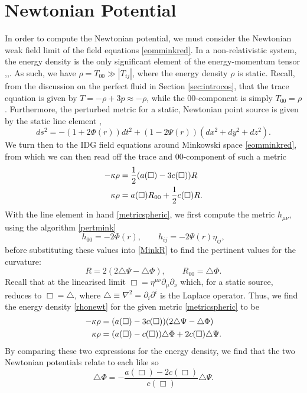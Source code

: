 \chapter{Newtonian Potential}
\label{chap:NewtPot}
In order to compute the Newtonian potential, we must consider the Newtonian weak field limit of the field equations \eqref{eomminkred}. In a non-relativistic system, the energy density is the only significant element of the energy-momentum tensor \cite{Carroll:2004st},\cite{Wald:GR},\cite{Blau}. As such, we have $\rho=T_{00}\gg |T_{ij}|$, where the energy density $\rho$ is static. Recall, from the discussion on the perfect fluid in Section \ref{sec:introcos}, that the trace equation is given by $ T=-\rho+3p\approx-\rho$, while the 00-component is simply $T_{00}=\rho$. Furthermore, the perturbed metric for a static, Newtonian point source is given by the static line element \cite{Quandt:1990gc},\cite{Schwartz:2013pla}
\[
\label{metricspheric}
ds^2=-(1+2\Phi(r))dt^2+(1-2\Psi(r))(dx^2+dy^2+dz^2)
.\]
We turn then to the IDG field equations around Minkowski space \eqref{eomminkred}, from which we can then read off the trace and 00-component of such a metric
\begin{align}
-\kappa\rho&=\frac{1}{2}(a(\Box)-3c(\Box))R
\nonumber
\\
\label{rhonewt}
\kappa\rho&=a(\Box)R_{00}+\frac{1}{2}c(\Box)R.
 \end{align}
With the line element in hand \eqref{metricspheric}, we first compute the metric $h_{\mu\nu}$, using the algorithm \eqref{pertmink}
\[
h_{00}=-2\Phi(r),\qquad h_{ij}=-2\Psi(r)\eta_{ij},
\]
before substituting these values into \eqref{MinkR} to find the pertinent values for the curvature:
\[
R=2(2\triangle\Psi-\triangle\Phi),\qquad R_{00}=\triangle \Phi
.\]
Recall that at the linearised limit $\Box=\eta^{\mu\nu}\partial_\mu \partial_\nu$ which, for a static source, reduces to $\Box=\triangle$, where $\triangle\equiv\nabla^2=\partial_i \partial^i$ is the Laplace operator. Thus, we find the energy density \eqref{rhonewt} for the given metric \eqref{metricspheric} to be
\begin{align}
-\kappa\rho&=(a(\Box)-3c(\Box))(2\triangle\Psi-\triangle\Phi)\nonumber
\\
\kappa\rho&=(a(\Box)-c(\Box))\triangle\Phi+2c(\Box)\triangle\Psi
.
\end{align}
By comparing these two expressions for the energy density, we find that the two Newtonian potentials relate to each like so
\[
\label{PhiPsirelate}
\triangle\Phi=-\frac{a(\Box)-2c(\Box)}{c(\Box)}\triangle\Psi
.\]
